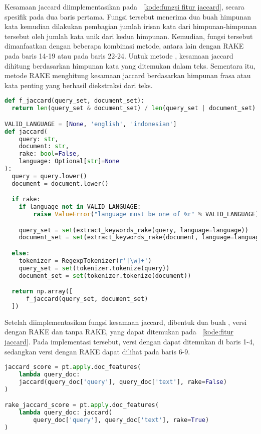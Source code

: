 Kesamaan jaccard diimplementasikan pada \kode{}~\ref{kode:fungsi fitur jaccard}, secara spesifik pada dua baris pertama. Fungsi tersebut menerima dua buah himpunan kata kemudian dilakukan pembagian jumlah irisan kata dari himpunan-himpunan tersebut oleh jumlah kata unik dari kedua himpunan. Kemudian, fungsi tersebut dimanfaatkan dengan beberapa kombinasi metode, antara lain dengan RAKE pada baris 14-19 atau \regex{} pada baris 22-24. 
Untuk metode \regex{}, kesamaan jaccard dihitung berdasarkan himpunan kata yang ditemukan dalam teks. Sementara itu, metode RAKE menghitung kesamaan jaccard berdasarkan himpunan frasa atau kata penting yang berhasil diekstraksi dari teks.
\begin{lstlisting}[language=Python, caption={Fungsi fitur jaccard}, label={kode:fungsi fitur jaccard}]
def f_jaccard(query_set, document_set):
  return len(query_set & document_set) / len(query_set | document_set)

VALID_LANGUAGE = [None, 'english', 'indonesian']
def jaccard(
    query: str,
    document: str,
    rake: bool=False,
    language: Optional[str]=None
):
  query = query.lower()
  document = document.lower()

  if rake:
    if language not in VALID_LANGUAGE:
        raise ValueError("language must be one of %r" % VALID_LANGUAGE)

    query_set = set(extract_keywords_rake(query, language=language))
    document_set = set(extract_keywords_rake(document, language=language))

  else:
    tokenizer = RegexpTokenizer(r'[\w]+')
    query_set = set(tokenizer.tokenize(query))
    document_set = set(tokenizer.tokenize(document))

  return np.array([
      f_jaccard(query_set, document_set)
  ])
\end{lstlisting}


Setelah diimplementasikan fungsi kesamaan jaccard, dibentuk dua buah \pipeline{}, versi dengan RAKE dan tanpa RAKE, yang dapat ditemukan pada \kode{}~\ref{kode:fitur jaccard}. Pada implementasi tersebut, versi \pipeline{} dengan \regex{} dapat ditemukan di baris 1-4, sedangkan versi \pipeline{} dengan RAKE dapat dilihat pada baris 6-9.
\begin{lstlisting}[language=Python, caption={\Pipeline{} ekstraksi fitur jaccard}, label={kode:fitur jaccard}]
jaccard_score = pt.apply.doc_features(
    lambda query_doc:
    jaccard(query_doc['query'], query_doc['text'], rake=False)
)

rake_jaccard_score = pt.apply.doc_features(
    lambda query_doc: jaccard(
        query_doc['query'], query_doc['text'], rake=True)
)
\end{lstlisting}



